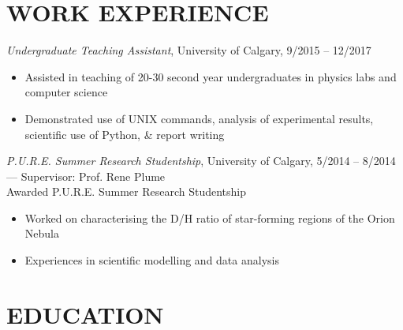 \documentclass[letter, margin, 10pt]{res} %
\begin{document}
\begin{resume}
\section{WORK EXPERIENCE}

{\sl Undergraduate Teaching Assistant}, University of Calgary, 9/2015 -- 12/2017
\begin{itemize}[noitemsep,topsep=0pt,parsep=0pt,partopsep=0pt]
\item Assisted in teaching of 20-30 second year undergraduates in physics labs and computer science 
\item Demonstrated use of UNIX commands, analysis of experimental results, scientific use of Python, \& report writing
\end{itemize}
\vspace{-10pt}
{\sl P.U.R.E. Summer Research Studentship}, University of Calgary, 5/2014 -- 8/2014 --- Supervisor: Prof. Rene Plume\\
\null\quad\quad Awarded P.U.R.E. Summer Research Studentship
\begin{itemize}[noitemsep,topsep=0pt,parsep=0pt,partopsep=0pt]
\item Worked on characterising the D/H ratio of star-forming regions of the Orion Nebula
\item Experiences in scientific modelling and data analysis
\end{itemize}


\vspace{-9pt}
\section{EDUCATION}


\end{resume}
\end{document}
